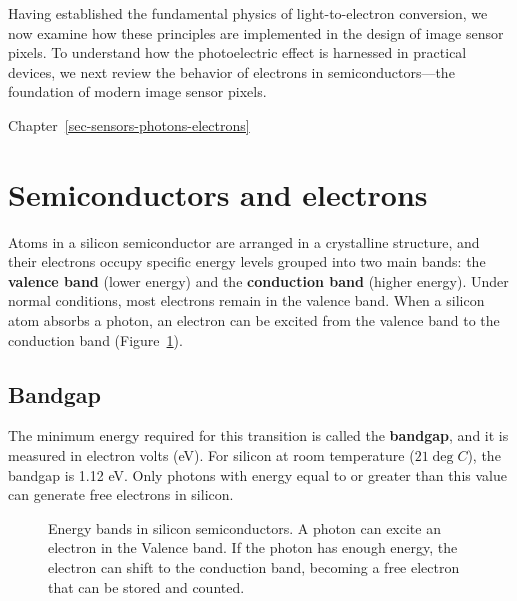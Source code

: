 \documentclass[
  letterpaper,
]{book}
\begin{document}
Having established the fundamental physics of light-to-electron
conversion, we now examine how these principles are implemented in the
design of image sensor pixels. To understand how the photoelectric
effect is harnessed in practical devices, we next review the behavior of
electrons in semiconductors---the foundation of modern image sensor
pixels.

Chapter~\ref{sec-sensors-photons-electrons}

\section{Semiconductors and electrons}\label{sec-semiconductor-physics}

Atoms in a silicon semiconductor are arranged in a crystalline
structure, and their electrons occupy specific energy levels grouped
into two main bands: the \textbf{valence band} (lower energy) and the
\textbf{conduction band} (higher energy). Under normal conditions, most
electrons remain in the valence band. When a silicon atom absorbs a
photon, an electron can be excited from the valence band to the
conduction band (Figure~\ref{fig-sensor-bandgap}).

\subsection{Bandgap}\label{sec-bandgap-photon-absorption}

The minimum energy required for this transition is called the
\textbf{bandgap}, and it is measured in electron volts (eV). For silicon
at room temperature (\(21 \deg C\)), the bandgap is 1.12 eV. Only
photons with energy equal to or greater than this value can generate
free electrons in silicon.

\begin{figure}


\caption{\label{fig-sensor-bandgap}Energy bands in silicon
semiconductors. A photon can excite an electron in the Valence band. If
the photon has enough energy, the electron can shift to the conduction
band, becoming a free electron that can be stored and counted.}

\end{figure}%
\end{document}
